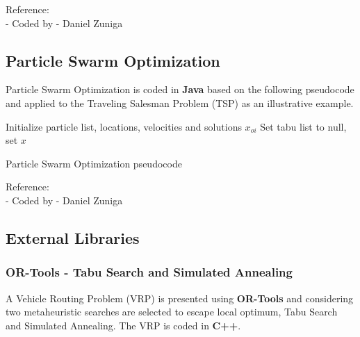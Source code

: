 \documentclass[10pt,bezier]{article}
\begin{document}
\noindent Reference:\\
- Coded by - Daniel Zuniga

\newpage
\subsection{Particle Swarm Optimization}\label{section6.3}
Particle Swarm Optimization is coded in {\color{blue}\textbf{Java}} based on the following pseudocode and applied to the Traveling Salesman Problem (TSP) as an illustrative example.

\begin{algorithm}[H]
\SetAlgoLined
{}
 Initialize particle list, locations, velocities and solutions $x_{oi}$\;
 Set tabu list to null, set $x$\;

 \caption{Particle Swarm Optimization pseudocode}
\end{algorithm}

\noindent Reference:\\
- Coded by - Daniel Zuniga
\newpage
\subsection{External Libraries}\label{section6.4}

\subsubsection{OR-Tools - Tabu Search and Simulated Annealing}\label{section6.4.1}
A Vehicle Routing Problem (VRP) is presented using {\color{blue}\textbf{OR-Tools}} and considering two metaheuristic searches are selected to escape local optimum, Tabu Search and Simulated Annealing. The VRP is coded in {\color{blue}\textbf{C++}}.\\
\end{document}
